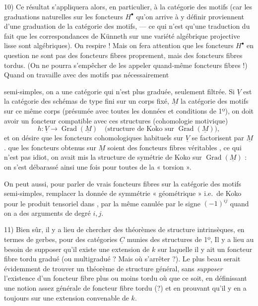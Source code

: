 \documentclass[11pt,a4paper]{article}
\begin{document}
10) Ce résultat s'appliquera alors, en particulier, à la catégorie des motifs
 (car les \struck{\ill{}} graduations naturelles sur les
foncteurs $H^{\bullet}$ qu'on arrive à y définir  proviennent d'une
graduation de la catégorie des motifs, --- ce qui n'est qu'une traduction du
fait que les correspondances de Künneth  sur une variété
algébrique projective lisse sont algébriques). On respire ! Mais on fera
attention que les foncteurs $H^{\bullet}$ en question ne sont pas des foncteurs
fibres proprement, mais des foncteurs fibres tordus. (On ne pourra s'empêcher de
les appeler quand-même foncteurs fibres !) Quand on travaille avec des motifs
pas nécessairement


semi-simples, on a une catégorie qui n'est plus graduée, seulement filtrée. Si
$\underline{V}$ est la catégorie des schémas de type fini sur un corps fixé,
$\underline{M}$ la catégorie des motifs sur ce même corps (présumée avec toutes
les données et conditions de 1º), on doit avoir un foncteur
compatible avec ces structures (cohomologie motivique)
\[ h : \underline{V} \longrightarrow \operatorname{Grad}(\underline{M})
   \quad \text{(structure de Koko sur } \operatorname{Grad}(\underline{M})) , \]
et on désire que les foncteurs cohomologiques habituels sur $\underline{V}$ se
factorisent par $\underline{M}$.   que les
foncteurs  obtenus sur $\underline{M}$ soient des foncteurs
fibres  véritables , ce qui n'est pas
idiot,  on avait mis la structure de symétrie de Koko sur
$\operatorname{Grad}(\underline{M})$ : on s'est débarassé ainsi une fois pour
toutes de la « torsion ».

On peut aussi, pour parler de vrais foncteurs fibres sur la catégorie des motifs
semi-simples, remplacer la donnée de symmétrie « géométrique » i.e.\ de Koko
pour le produit tensoriel dans 
, par la même canulée par le signe
$(-1)^{ij}$ quand on a des arguments de degré $i, j$.

11) Bien sûr, il y a lieu de chercher des théorèmes de structure intrinsèques,
en termes de gerbes, pour des catégories $\underline{C}$ munies des structures
de 1º,  Il y a lieu au besoin de supposer qu'il existe une extension de
$k$ sur laquelle il y ait un foncteur fibre tordu gradué (ou multigradué ? Mais
où s'arrêter ?). Le plus beau serait évidemment de trouver un théorème de
structure général, sans \emph{supposer} l'existence d'un foncteur fibre plus ou
moins tordu où que ce soit, en définissant une notion assez générale de foncteur
fibre tordu (?) et en prouvant qu'il y en a toujours sur une extension
convenable de $k$.
\end{document}

